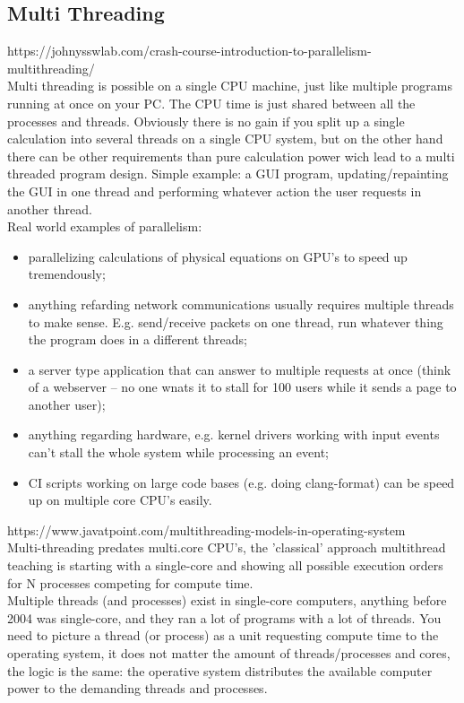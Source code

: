 \documentclass[11pt, a4paper, oneside]{article}
\theoremstyle{definition}
\begin{document}
\subsection{Multi Threading}
https://johnysswlab.com/crash-course-introduction-to-parallelism-multithreading/\\
Multi threading is possible on a single CPU machine, just like multiple programs running at once on your PC. The CPU time is just shared between all the processes and threads. Obviously there is no gain if you split up a single calculation into several threads on a single CPU system, but on the other hand there can be other requirements than pure calculation power wich lead to a multi threaded program design. Simple example: a GUI program, updating/repainting the GUI in one thread and performing whatever action the user requests in another thread.\\

Real world examples of parallelism:\\
\begin{itemize}
	\item parallelizing calculations of physical equations on GPU's to speed up tremendously;
	\item anything refarding network communications usually requires multiple threads to make sense. E.g. send/receive packets on one thread, run whatever thing the program does in a different threads;
	\item a server type application that can answer to multiple requests at once (think of a webserver -- no one wnats it to stall for 100 users while it sends a page to another user);
	\item anything regarding hardware, e.g. kernel drivers working with input events can't stall the whole system while processing an event;
	\item CI scripts working on large code bases (e.g. doing clang-format) can be speed up on multiple core CPU's easily.
\end{itemize}

https://www.javatpoint.com/multithreading-models-in-operating-system\\
Multi-threading predates multi.core CPU's, the 'classical' approach multithread teaching is starting with a single-core and showing all possible execution orders for N processes competing for compute time.\\
Multiple threads (and processes) exist in single-core computers, anything before 2004 was single-core, and they ran a lot of programs with a lot of threads. You need to picture a thread (or process) as a unit requesting compute time to the operating system, it does not matter the amount of threads/processes and cores, the logic is the same: the operative system distributes the available computer power to the demanding threads and processes.\\
\end{document}
